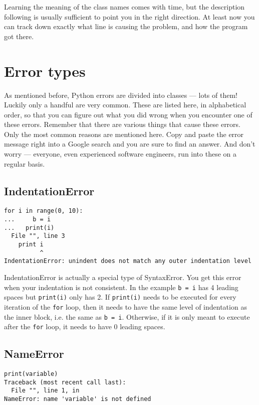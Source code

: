 Learning the meaning of the class names comes with time, but the   description following is usually sufficient to point you in the right   direction. At least now you can track down exactly what line is causing   the problem, and how the program got there.

\section{Error types}

As mentioned before, Python errors are divided into classes --- lots of them!                 Luckily only a handful are very common. These are listed here, in alphabetical order,                 so that you can figure out what you did wrong when you encounter one of these errors. Remember that                 there are various things that cause these errors. Only the most common reasons are mentioned here. Copy and paste the error message                 right into a Google search and you are sure to find an answer. And don't worry ---                  everyone, even experienced software engineers, run into these on a regular basis.

\subsection{IndentationError}


\begin{lstlisting}
for i in range(0, 10):
...     b = i
...   print(i)
  File "", line 3
    print i
          ^
IndentationError: unindent does not match any outer indentation level\end{lstlisting}

IndentationError is actually a special type of SyntaxError. You get this error when your indentation is not consistent. In the                  example 
\texttt{b = i} has 4 leading spaces but 
\texttt{print(i)} only has 2. If 
\texttt{print(i)} needs to be executed                 for every iteration of the \texttt{for} loop, then it needs to have the same level of indentation as the inner block, i.e. the same as 
\texttt{b = i}.                 Otherwise, if it is only meant to execute after the \texttt{for} loop, it needs to have 0 leading spaces.

\subsection{NameError}

\begin{lstlisting}
print(variable)
Traceback (most recent call last):
  File "", line 1, in 
NameError: name 'variable' is not defined\end{lstlisting}

